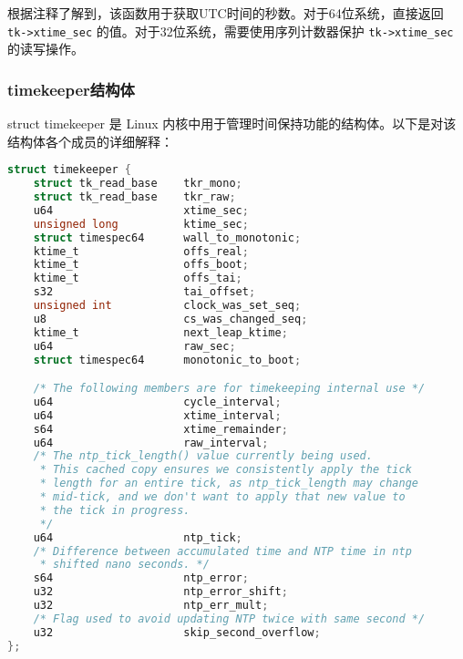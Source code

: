 \documentclass[12pt,hyperref,a4paper,UTF8]{ctexart}
\begin{document}
根据注释了解到，该函数用于获取UTC时间的秒数。对于64位系统，直接返回 \lstinline|tk->xtime_sec| 的值。对于32位系统，需要使用序列计数器保护 \lstinline|tk->xtime_sec| 的读写操作。

\subsubsection{timekeeper结构体}

struct timekeeper 是 Linux 内核中用于管理时间保持功能的结构体。以下是对该结构体各个成员的详细解释：

\begin{lstlisting}[language=C, caption=timekeeper in timekeeper\_internal.h, label=timekeeper]
struct timekeeper {
    struct tk_read_base    tkr_mono;
    struct tk_read_base    tkr_raw;
    u64                    xtime_sec;
    unsigned long          ktime_sec;
    struct timespec64      wall_to_monotonic;
    ktime_t                offs_real;
    ktime_t                offs_boot;
    ktime_t                offs_tai;
    s32                    tai_offset;
    unsigned int           clock_was_set_seq;
    u8                     cs_was_changed_seq;
    ktime_t                next_leap_ktime;
    u64                    raw_sec;
    struct timespec64      monotonic_to_boot;

    /* The following members are for timekeeping internal use */
    u64                    cycle_interval;
    u64                    xtime_interval;
    s64                    xtime_remainder;
    u64                    raw_interval;
    /* The ntp_tick_length() value currently being used.
     * This cached copy ensures we consistently apply the tick
     * length for an entire tick, as ntp_tick_length may change
     * mid-tick, and we don't want to apply that new value to
     * the tick in progress.
     */
    u64                    ntp_tick;
    /* Difference between accumulated time and NTP time in ntp
     * shifted nano seconds. */
    s64                    ntp_error;
    u32                    ntp_error_shift;
    u32                    ntp_err_mult;
    /* Flag used to avoid updating NTP twice with same second */
    u32                    skip_second_overflow;
};
\end{lstlisting}
\end{document}
